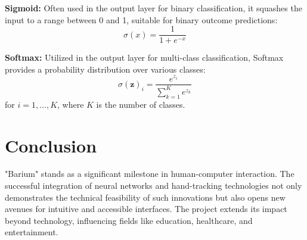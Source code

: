 \documentclass{article}
\begin{document}
\textbf{Sigmoid:} Often used in the output layer for binary classification, it squashes the input to a range between 0 and 1, suitable for binary outcome predictions:
\begin{equation}
\sigma(x) = \frac{1}{1 + e^{-x}}
\end{equation}

\textbf{Softmax:} Utilized in the output layer for multi-class classification, Softmax provides a probability distribution over various classes:
\begin{equation}
\sigma(\mathbf{z})_i = \frac{e^{z_i}}{\sum_{k=1}^{K} e^{z_k}}
\end{equation}
for \( i = 1, \ldots, K \), where \( K \) is the number of classes.

\clearpage %

\section{Conclusion}
"Barium" stands as a significant milestone in human-computer interaction. The successful integration of neural networks and hand-tracking technologies not only demonstrates the technical feasibility of such innovations but also opens new avenues for intuitive and accessible interfaces. The project extends its impact beyond technology, influencing fields like education, healthcare, and entertainment.



\end{document}
